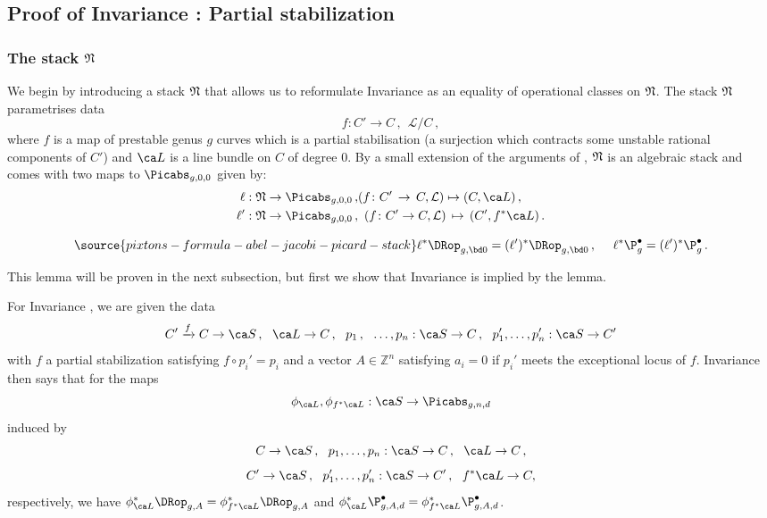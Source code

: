 \subsection{Proof of Invariance \invnrIV{}: {\rm Partial stabilization}}\label{sec:proof_inv_IV}
\subsubsection{The stack $\frak N$}
We begin by introducing a stack $\frak N$ that allows us to reformulate Invariance \invnrIV{} as an equality of operational classes on $\frak N$. The stack  $\frak N$ parametrises data
\[f \colon C' \to C\,,\ \ \mathcal{L}/C\,,\]
where $f$ is a map of prestable genus $g$ curves which is a partial stabilisation (a surjection which contracts some unstable rational components of $C'$) and $\ca L$ is a line bundle on $C$ of degree $0$.  By a small extension of the arguments of \cite{Kresch2013Flattening-stra},
$\frak N$ is an algebraic stack
and comes with two maps to $\Picabs_{g,0,0}$ given by:
\begin{eqnarray*}
\targetmap: \frak N \to \Picabs_{g,0,0}\, ,  & (f \colon C' \, \to\,  C, \mathcal{L}) \mapsto (C,\ca L)\, , \\
\sourcemap: \frak N \to \Picabs_{g,0,0}\, , & \ \,(f \colon C' \to C, \mathcal{L})\,  \mapsto\,  (C',f^*\ca L)\,.
\end{eqnarray*}

\begin{lemma}
\notready\label{lem:invariance_N}
\begin{equation} \label{eqn:InvIVreformulation}
\source{pixtons-formula-abel-jacobi-picard-stack}
    \targetmap^*\DRop_{g,\bd 0} = (\sourcemap)^*\DRop_{g, \bd 0}\, ,\ \ \ \ \targetmap^* \P_{g}^\bullet = (\sourcemap)^* \P_g^\bullet\, .
\end{equation}
\end{lemma}
This lemma will be proven in the next subsection, but first we show that Invariance \invnrIV{} is implied  by the lemma.

For Invariance \invnrIV, we are given the data
\[C' \xrightarrow{f} C \to \ca S\, ,\ \ \ca L \to C\, ,\ \  p_1\, , \ \ \ldots, p_n : \ca S \to C\, ,\ \ p_1', \ldots, p_n' : \ca S \to C'\]
with $f$ a partial stabilization satisfying $f \circ p_i' = p_i$ and a vector $A \in \mathbb{Z}^n$ satisfying $a_i=0$ if $p_i'$ meets the exceptional locus of $f$. Invariance \invnrIV{} then says that for the maps $$\phi_{\ca L}, \phi_{f^* \ca L} : \ca S \to \Picabs_{g,n,d}$$ induced by
\[C \to \ca S\, , \ \ p_1, \ldots, p_n : \ca S \to C\, , \ \ \ca L \to C\, ,\]
\[C' \to \ca S\, ,\ \  p_1', \ldots, p_n' : \ca S \to C'\, ,\ \  f^*\ca L \to C,\]
respectively, we have $\phi_{\ca L}^* \DRop_{g,A} = \phi_{f^*\ca L}^* \DRop_{g,A}$ and $\phi_{\ca L}^* \P^\bullet_{g,A,d} = \phi_{f^*\ca L}^* \P^\bullet_{g,A,d}$.

